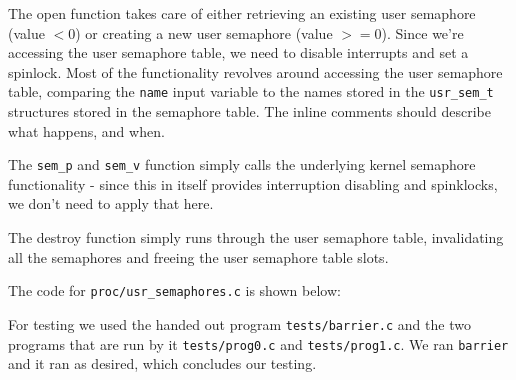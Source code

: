 \documentclass[a4paper,12pt]{article}
\begin{document}
The open function takes care of either retrieving an existing user semaphore (value $< 0$) or creating a new user semaphore (value $>= 0$). Since we're accessing the user semaphore table, we need to disable interrupts and set a spinlock. Most of the functionality revolves around accessing the user semaphore table, comparing the \texttt{name} input variable to the names stored in the \texttt{usr\_sem\_t} structures stored in the semaphore table. The inline comments should describe what happens, and when.

The \texttt{sem\_p} and \texttt{sem\_v} function simply calls the underlying kernel semaphore functionality - since this in itself provides interruption disabling and spinklocks, we don't need to apply that here.

The destroy function simply runs through the user semaphore table, invalidating all the semaphores and freeing the user semaphore table slots.

The code for \texttt{proc/usr\_semaphores.c} is shown below:


For testing we used the handed out program \texttt{tests/barrier.c} and the two programs that are run by it \texttt{tests/prog0.c} and \texttt{tests/prog1.c}. We ran \texttt{barrier} and it ran as desired, which concludes our testing.
\end{document}
